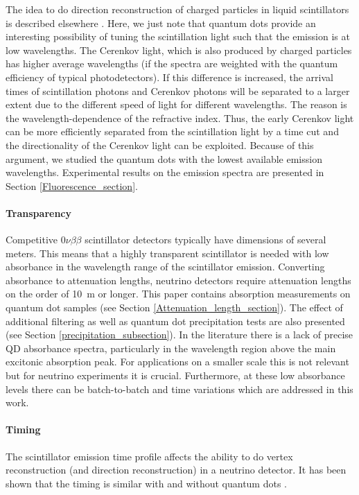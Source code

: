 \documentclass[cits]{JINST}
\begin{document}
The idea to do direction reconstruction of charged particles in liquid scintillators is described elsewhere \cite{mitpaper,simpaper}. Here, we just note that quantum dots provide an interesting possibility of tuning the scintillation light such that the emission is at low wavelengths. The Cerenkov light, which is also produced by charged particles has higher average wavelengths (if the spectra are weighted with the quantum efficiency of typical photodetectors). If this difference is increased, the arrival times of scintillation photons and Cerenkov photons will be separated to a larger extent due to the different speed of light for different wavelengths. The reason is the wavelength-dependence of the refractive index. Thus, the early Cerenkov light can be more efficiently separated from the scintillation light by a time cut and the directionality of the Cerenkov light can be exploited. Because of this argument, we studied the quantum dots with the lowest available emission wavelengths. Experimental results on the emission spectra are presented in Section \ref{Fluorescence_section}. 

\paragraph{Transparency}
Competitive 0$\nu\beta\beta$ scintillator detectors typically have dimensions of several meters. This means that a highly transparent scintillator is needed with low absorbance in the wavelength range of the scintillator emission. Converting absorbance to attenuation lengths, neutrino detectors require attenuation lengths on the order of 10~m or longer. This paper contains absorption measurements on quantum dot samples (see Section \ref{Attenuation_length_section}). The effect of additional filtering as well as quantum dot precipitation tests are also presented (see Section \ref{precipitation_subsection}). In the literature there is a lack of precise QD absorbance spectra, particularly in the wavelength region above the main excitonic absorption peak. For applications on a smaller scale this is not relevant but for neutrino experiments it is crucial. Furthermore, at these low absorbance levels there can be batch-to-batch and time variations which are addressed in this work.  
\paragraph{Timing}
The scintillator emission time profile affects the ability to do vertex reconstruction (and direction reconstruction) in a neutrino detector. It has been shown that the timing is similar with and without quantum dots \cite{mitpaper}. 
\end{document}
